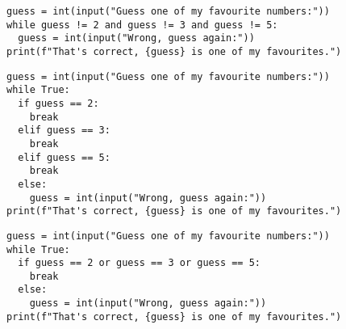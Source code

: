 \begin{frame}[fragile]
  \begin{example}
    \begin{verbatim}
guess = int(input("Guess one of my favourite numbers:"))
while guess != 2 and guess != 3 and guess != 5:
  guess = int(input("Wrong, guess again:"))
print(f"That's correct, {guess} is one of my favourites.")
    \end{verbatim}
  \end{example}
\end{frame}

\begin{frame}[fragile]
  \begin{example}
    \begin{verbatim}
guess = int(input("Guess one of my favourite numbers:"))
while True:
  if guess == 2:
    break
  elif guess == 3:
    break
  elif guess == 5:
    break
  else:
    guess = int(input("Wrong, guess again:"))
print(f"That's correct, {guess} is one of my favourites.")
    \end{verbatim}
  \end{example}
\end{frame}

\begin{frame}[fragile]
  \begin{example}
    \begin{verbatim}
guess = int(input("Guess one of my favourite numbers:"))
while True:
  if guess == 2 or guess == 3 or guess == 5:
    break
  else:
    guess = int(input("Wrong, guess again:"))
print(f"That's correct, {guess} is one of my favourites.")
    \end{verbatim}
  \end{example}
\end{frame}
